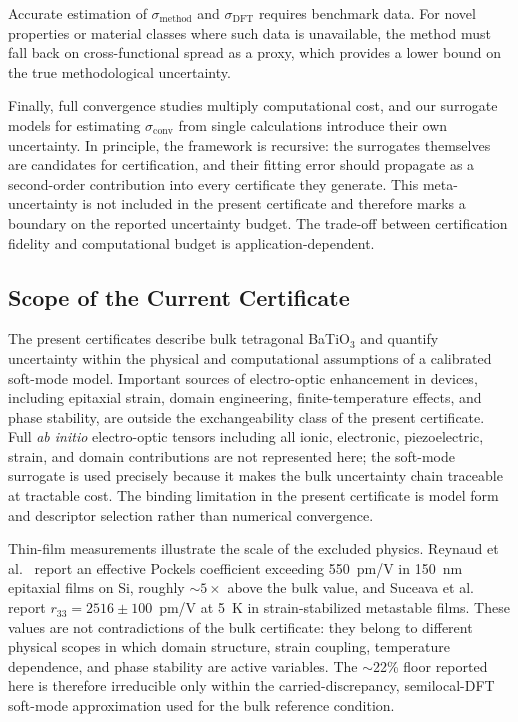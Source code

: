\documentclass[twocolumn,superscriptaddress,amsmath,amssymb,longbibliography]{revtex4-2}
\newcommand{\conv}{\mathrm{conv}}
\newcommand{\meth}{\mathrm{method}}
\begin{document}
Accurate estimation of $\sigma_\meth$ and $\sigma_{\mathrm{DFT}}$ requires
benchmark data. For novel properties or material classes where such data is
unavailable, the method must fall back on cross-functional spread as a proxy,
which provides a lower bound on the true methodological uncertainty.

Finally, full convergence studies multiply computational cost, and our surrogate
models for estimating $\sigma_\conv$ from single calculations introduce their
own uncertainty. In principle, the framework is recursive: the surrogates
themselves are candidates for certification, and their fitting error should
propagate as a second-order contribution into every certificate they generate.
This meta-uncertainty is not included in the present certificate and therefore
marks a boundary on the reported uncertainty budget. The trade-off between
certification fidelity and computational budget is application-dependent.

\subsection{Scope of the Current Certificate}

The present certificates describe bulk tetragonal BaTiO$_3$ and quantify uncertainty within the physical and computational assumptions of a calibrated soft-mode model. Important sources of electro-optic enhancement in devices, including epitaxial strain, domain engineering, finite-temperature effects, and phase stability, are outside the exchangeability class of the present certificate. Full \emph{ab initio} electro-optic tensors including all ionic, electronic, piezoelectric, strain, and domain contributions are not represented here; the soft-mode surrogate is used precisely because it makes the bulk uncertainty chain traceable at tractable cost. The binding limitation in the present certificate is model form and descriptor selection rather than numerical convergence.

Thin-film measurements illustrate the scale of the excluded physics. Reynaud et al.\ \cite{Reynaud2025} report an effective Pockels coefficient exceeding 550~pm/V in 150~nm epitaxial films on Si, roughly $\sim$$5\times$ above the bulk value, and Suceava et al.\ \cite{Suceava2025} report $r_{33} = 2516 \pm 100$~pm/V at 5~K in strain-stabilized metastable films. These values are not contradictions of the bulk certificate: they belong to different physical scopes in which domain structure, strain coupling, temperature dependence, and phase stability are active variables. The $\sim$22\% floor reported here is therefore irreducible only within the carried-discrepancy, semilocal-DFT soft-mode approximation used for the bulk reference condition.
\end{document}
